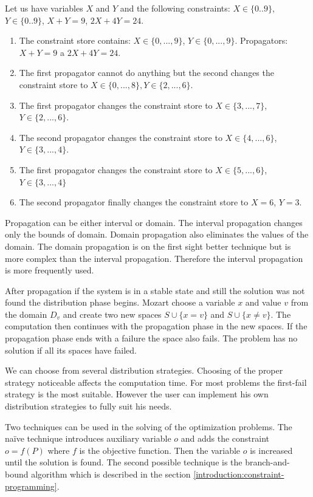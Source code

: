 \begin{example} Let us have variables $X$ and $Y$ and the following constraints: $X \in \{0..9\}$, $Y \in \{0..9\}$, 
  $X+Y = 9$, $2X + 4Y = 24$. 
\begin{enumerate}
  \item The constraint store contains: $X \in \{0,...,9\}$, $Y \in \{0,...,9\}$. Propagators: $X+Y = 9$ a $2X + 4Y = 24$.
  \item	The first propagator cannot do anything but the second changes the constraint store to $X \in \{0,...,8\}, Y \in \{2,...,6\}$.
  \item	The first propagator changes the constraint store to $X \in \{3,...,7\}$,\\ $Y \in \{2,...,6\}$.
  \item	The second propagator changes the constraint store to $X \in \{4,...,6\}$, $Y \in \{3,...,4\}$.
  \item	The first propagator changes the constraint store to $X \in \{5,...,6\}$,\\ $Y \in \{3,...,4\}$
  \item	The second propagator finally changes the constraint store to $X = 6$, $Y = 3$.
\end{enumerate}
\end{example}

Propagation can be either interval or domain. The interval propagation changes only 
the bounds of domain. Domain propagation also eliminates the values of the domain.
The domain propagation is on the first sight better technique but is more complex
than the interval propagation. Therefore the interval propagation is more frequently used.

After propagation if the system is in a stable state and still the solution was not found
the distribution phase begins. Mozart choose a variable $x$ and value $v$ from the domain
 $D_v$ and create two new spaces $S \cup \{x = v\}$ and $S \cup \{x \neq v\}$.
 The computation then continues with the propagation phase in the new spaces.
 If the propagation phase ends with a failure the space also fails. The problem has no
 solution if all its spaces have failed.

We can choose from several distribution strategies. Choosing of the proper strategy 
noticeable affects the computation time.  For most problems the first-fail strategy is
the most suitable. However the user can implement his own distribution strategies to fully
suit his needs.

Two techniques can be used in the solving of the optimization problems. The na\"{i}ve 
technique introduces auxiliary variable $o$ and adds the constraint $o = f(P)$ where $f$ is the
objective function. Then the variable $o$ is increased until the solution is found. The second possible
technique is the branch-and-bound algorithm which is described in the section \ref{introduction:constraint-programming}.

